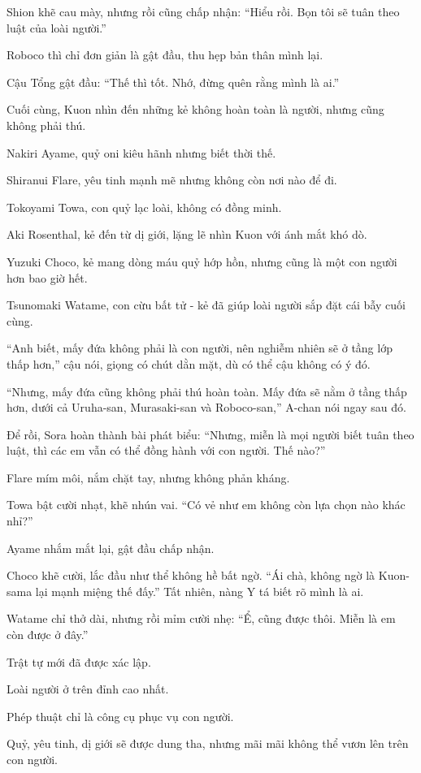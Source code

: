 \documentclass[../main.tex]{subfiles}
\begin{document}
Shion khẽ cau mày, nhưng rồi cũng chấp nhận: ``Hiểu rồi. Bọn tôi sẽ tuân theo luật của loài người.''

Roboco thì chỉ đơn giản là gật đầu, thu hẹp bản thân mình lại.

Cậu Tổng gật đầu: ``Thế thì tốt. Nhớ, đừng quên rằng mình là ai.''

Cuối cùng, Kuon nhìn đến những kẻ không hoàn toàn là người, nhưng cũng không phải thú.

Nakiri Ayame, quỷ oni kiêu hãnh nhưng biết thời thế.

Shiranui Flare, yêu tinh mạnh mẽ nhưng không còn nơi nào để đi.

Tokoyami Towa, con quỷ lạc loài, không có đồng minh.

Aki Rosenthal, kẻ đến từ dị giới, lặng lẽ nhìn Kuon với ánh mắt khó dò.

Yuzuki Choco, kẻ mang dòng máu quỷ hớp hồn, nhưng cũng là một con người hơn bao giờ hết.

Tsunomaki Watame, con cừu bất tử - kẻ đã giúp loài người sắp đặt cái bẫy cuối cùng.

``Anh biết, mấy đứa không phải là con người, nên nghiễm nhiên sẽ ở tầng lớp thấp hơn,'' cậu nói, giọng có chút dằn mặt, dù có thể cậu không có ý đó.

``Nhưng, mấy đứa cũng không phải thú hoàn toàn. Mấy đứa sẽ nằm ở tầng thấp hơn, dưới cả Uruha-san, Murasaki-san và Roboco-san,'' A-chan nói ngay sau đó.

Để rồi, Sora hoàn thành bài phát biểu: ``Nhưng, miễn là mọi người biết tuân theo luật, thì các em vẫn có thể đồng hành với con người. Thế nào?''

Flare mím môi, nắm chặt tay, nhưng không phản kháng.

Towa bật cười nhạt, khẽ nhún vai. ``Có vẻ như em không còn lựa chọn nào khác nhỉ?''

Ayame nhắm mắt lại, gật đầu chấp nhận.

Choco khẽ cười, lắc đầu như thể không hề bất ngờ. ``Ái chà, không ngờ là Kuon-sama lại mạnh miệng thế đấy.'' Tất nhiên, nàng Y tá biết rõ mình là ai.

Watame chỉ thở dài, nhưng rồi mỉm cười nhẹ: ``Ể, cũng được thôi. Miễn là em còn được ở đây.''

Trật tự mới đã được xác lập.

Loài người ở trên đỉnh cao nhất.

Phép thuật chỉ là công cụ phục vụ con người.

Quỷ, yêu tinh, dị giới sẽ được dung tha, nhưng mãi mãi không thể vươn lên trên con người.
\end{document}
